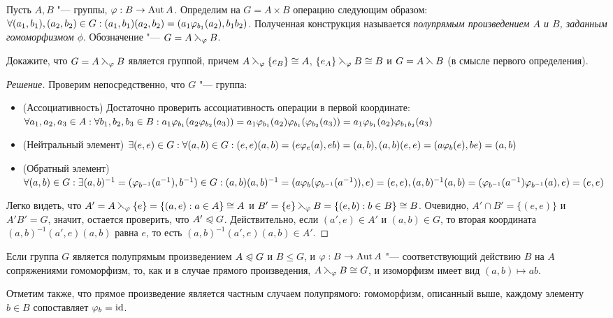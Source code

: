 \begin{definition}
	Пусть $A, B$ "--- группы, $\varphi: B \to \operatorname{Aut}{A}$. Определим на $G = A \times B$ операцию следующим образом: $\forall (a_1, b_1), (a_2, b_2) \hm\in G: (a_1, b_1)(a_2, b_2) = (a_1\phi_{b_1}(a_2), b_1b_2)$. Полученная конструкция называется \textit{полупрямым произведением $A$ и $B$, заданным гомоморфизмом $\phi$}. Обозначение "--- $G = A \leftthreetimes_{\varphi} B$.
\end{definition}

\begin{exercise}
	Докажите, что $G = A \leftthreetimes_{\varphi} B$ является группой, причем $A \sd_\phi \{e_B\} \hm\cong A$, $\{e_A\} \leftthreetimes_{\varphi} B \cong B$ и $G = A \leftthreetimes B$ (в смысле первого определения).
\end{exercise}

\begin{proof}[Решение]
	Проверим непосредственно, что $G$ "--- группа:
	\begin{itemize}
		\item (Ассоциативность) Достаточно проверить ассоциативность операции в первой координате: $\forall a_1, a_2, a_3 \in A: \forall b_1, b_2, b_3 \in B: a_1\phi_{b_1}(a_2\phi_{b_2}(a_3)) = a_1\phi_{b_1}(a_2)\phi_{b_1}(\phi_{b_2}(a_3)) \hm= a_1\phi_{b_1}(a_2)\phi_{b_1b_2}(a_3)$
		\item (Нейтральный элемент) $\exists (e, e) \in G: \forall (a, b) \in G: (e, e)(a, b) \hm= (e\phi_e(a), eb) \hm= (a, b), (a, b)(e, e) = (a\phi_b(e), be) = (a, b)$
		\item (Обратный элемент) $\forall (a, b) \in G: \exists (a, b)^{-1} = (\phi_{b^{-1}}(a^{-1}), b^{-1}) \hm\in G: (a, b)(a, b)^{-1} \hm= (a\phi_b(\phi_{b^{-1}}(a^{-1})), e) = (e, e), (a, b)^{-1}(a, b) \hm= (\phi_{b^{-1}}(a^{-1})\phi_{b^{-1}}(a), e) = (e, e)$
	\end{itemize}
	
	Легко видеть, что $A' = A \leftthreetimes_{\varphi} \{e\} = \{(a, e): a \in A\} \cong A$ и $B' \hm= \{e\} \sd_\phi B \hm = \{(e, b): b \hm\in B\} \cong B$. Очевидно, $A' \cap B' = \{(e, e)\}$ и $A'B' = G$, значит, остается проверить, что $A' \trianglelefteqslant G$. Действительно, если $(a', e) \in A'$ и $(a, b) \in G$, то вторая координата $(a, b)^{-1}(a', e)(a, b)$ равна $e$, то есть $(a, b)^{-1}(a', e)(a, b) \in A'$.
\end{proof}

\begin{note}
	Если группа $G$ является полупрямым произведением $A \trianglelefteqslant G$ и $B \le G$, и $\varphi: B \to \operatorname{Aut}{A}$ "--- соответствующий действию $B$ на $A$ сопряжениями гомоморфизм, то, как и в случае прямого произведения, $A \leftthreetimes_{\varphi} B \cong G$, и изоморфизм имеет вид $(a, b) \mapsto ab$.
	
	Отметим также, что прямое произведение является частным случаем полупрямого: гомоморфизм, описанный выше, каждому элементу $b \in B$ сопоставляет $\varphi_b = \operatorname{id}$.
\end{note}